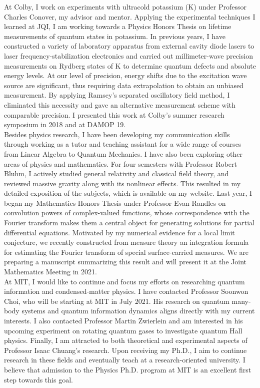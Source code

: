 \documentclass[12pt]{article}
\begin{document}
At Colby, I work on experiments with ultracold potassium (K) under Professor Charles Conover, my advisor and mentor. Applying the experimental techniques I learned at JQI, I am working towards a Physics Honors Thesis on lifetime measurements of quantum states in potassium. In previous years, I have constructed a variety of laboratory apparatus from external cavity diode lasers to laser frequency-stabilization electronics and carried out millimeter-wave precision measurements on Rydberg states of K to determine quantum defects and absolute energy levels. At our level of precision, energy shifts due to the excitation wave source are significant, thus requiring data extrapolation to obtain an unbiased measurement. By applying Ramsey's separated oscillatory field method, I eliminated this necessity and gave an alternative measurement scheme with comparable precision. I presented this work at Colby's summer research symposium in 2018 and at DAMOP 19.  \\

Besides physics research, I have been developing my communication skills through working as a tutor and teaching assistant for a wide range of courses from Linear Algebra to Quantum Mechanics. I have also been exploring other areas of physics and mathematics. For four semesters with Professor Robert Bluhm, I actively studied general relativity and classical field theory, and reviewed massive gravity along with its nonlinear effects. This resulted in my detailed exposition of the subjects, which is available on my website. Last year, I began my Mathematics Honors Thesis under Professor Evan Randles on convolution powers of complex-valued functions, whose correspondence with the Fourier transform makes them a central object for generating solutions for partial differential equations. Motivated by my numerical evidence for a local limit conjecture, we recently constructed from measure theory an integration formula for estimating the Fourier transform of special surface-carried measures. We are preparing a manuscript summarizing this result and will present it at the Joint Mathematics Meeting in 2021. \\ 

At MIT, I would like to continue and focus my efforts on researching quantum information and condensed-matter physics. I have contacted Professor Soonwon Choi, who will be starting at MIT in July 2021. His research on quantum many-body systems and quantum information dynamics aligns directly with my current interests. I also contacted Professor Martin Zwierlein and am interested in his upcoming experiment on rotating quantum gases to investigate quantum Hall physics. Finally, I am attracted to both theoretical and experimental aspects of Professor Isaac Chuang's research. Upon receiving my Ph.D., I aim to continue research in these fields and eventually teach at a research-oriented university. I believe that admission to the Physics Ph.D. program at MIT is an excellent first step towards this goal. \\
\end{document}
